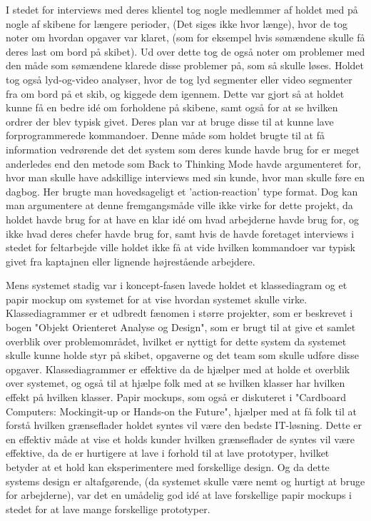 \documentclass[10pt,a4paper,danish]{article}
\begin{document}
I stedet for interviews med deres klientel tog nogle medlemmer af holdet med på nogle af skibene for længere perioder, 
(Det siges ikke hvor længe), hvor de tog noter om hvordan opgaver var klaret, (som for eksempel hvis sømændene skulle 
få deres last om bord på skibet). Ud over dette tog de også noter om problemer med den måde som sømændene klarede 
disse problemer på, som så skulle løses. Holdet tog også lyd-og-video analyser, hvor de tog lyd segmenter eller 
video segmenter fra om bord på et skib, og kiggede dem igennem. Dette var gjort så at holdet kunne få en bedre 
idé om forholdene på skibene, samt også for at se hvilken ordrer der blev typisk givet. Deres plan var at bruge disse 
til at kunne lave forprogrammerede kommandoer. Denne måde som holdet brugte til at få information vedrørende det 
det system som deres kunde havde brug for er meget anderledes end den metode som Back to Thinking Mode havde 
argumenteret for, hvor man skulle have adskillige interviews med sin kunde, hvor man skulle føre en dagbog. Her brugte 
man hovedsageligt et 'action-reaction' type format. Dog kan man argumentere at denne fremgangsmåde 
ville ikke virke for dette projekt, da holdet havde brug for at have en klar idé om hvad arbejderne havde brug for, og 
ikke hvad deres chefer havde brug for, samt hvis de havde foretaget interviews i stedet for feltarbejde ville holdet ikke 
få at vide hvilken kommandoer var typisk givet fra kaptajnen eller lignende højrestående arbejdere.

Mens systemet stadig var i koncept-fasen lavede holdet et klassediagram og et papir mockup om systemet for at vise 
hvordan systemet skulle virke. Klassediagrammer er et udbredt fænomen i større projekter, som er beskrevet i bogen 
"Objekt Orienteret Analyse og Design", som er brugt til at give et samlet overblik over problemområdet, hvilket 
er nyttigt for dette system da systemet skulle kunne holde styr på skibet, opgaverne og det team som skulle 
udføre disse opgaver. Klassediagrammer er effektive da de hjælper med at holde et overblik over systemet, og 
også til at hjælpe folk med at se hvilken klasser har hvilken effekt på hvilken klasser. Papir mockups, som også 
er diskuteret i "Cardboard Computers: Mockingit-up or Hands-on the Future", hjælper med at få folk til at forstå 
hvilken grænseflader holdet syntes vil være den bedste IT-løsning. Dette er en effektiv måde at vise et holds kunder 
hvilken grænseflader de syntes vil være effektive, da de er hurtigere at lave i forhold til at lave prototyper, hvilket 
betyder at et hold kan eksperimentere med forskellige design. Og da dette systems design er altafgørende, (da systemet 
skulle være nemt og hurtigt at bruge for arbejderne), var det en umådelig god idé at lave forskellige papir mockups i stedet 
for at lave mange forskellige prototyper.
\end{document}
